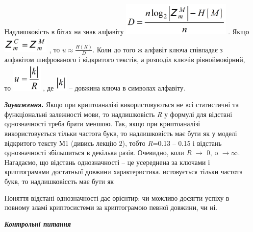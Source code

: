 \documentclass[a4paper]{article}
\newcounter{}
\begin{document}
Надлишковість в бітах на знак алфавіту 
\includegraphics[width=2.122in,height=0.65in]{crypt-img/crypt-img51.png} . Якщо
  \includegraphics[width=0.9047in,height=0.3311in]{crypt-img/crypt-img52.png} ,
 то   ${u\approx \frac{H(K)}{D}}$.  Коли до того ж алфавіт ключа співпадає з
алфавітом шифрованого і відкритого текстів, а розподіл ключів  рівноймовірний,
то  
\includegraphics[width=0.5862in,height=0.5665in]{crypt-img/crypt-img53.png} , 
де  
\includegraphics[width=0.2291in,height=0.3335in]{crypt-img/crypt-img54.png}  –
довжина ключа в символах алфавіту.

\textbf{\textit{Зауваження}}\textbf{.} Якщо при криптоаналізі використовуються
не всі статистичні та функціональні залежності мови, то надлишковість
\textit{R}\textit{ }у формулі для відстані однозначності треба брати меншою.
Так, якщо при криптоаналізі використовується тільки частота букв, то
надлишковість має бути як у моделі відкритого тексту М1 (дивись лекцію 2),
тобто \textit{R}=0.13 – 0.15  і відстань однозначності  збільшиться в декілька
разів.  Очевидно, коли  \textit{R} ${\rightarrow }$ 0,\textit{  u}
${\rightarrow \infty }$\textit{.  }Нагадаємо, що відстань однозначності – це
усереднена за ключами і криптограмами достатньої  довжини характеристика. 
истовується тільки частота букв, то надлишковіссть має бути як

Поняття відстані однозначності дає орієнтир: чи можливо досягти успіху в повному
зламі криптосистеми за криптограмою певної довжини, чи ні.


\bigskip


\bigskip

{\centering\bfseries\itshape
Контрольні питання
\par}


\bigskip


\bigskip
\end{document}
